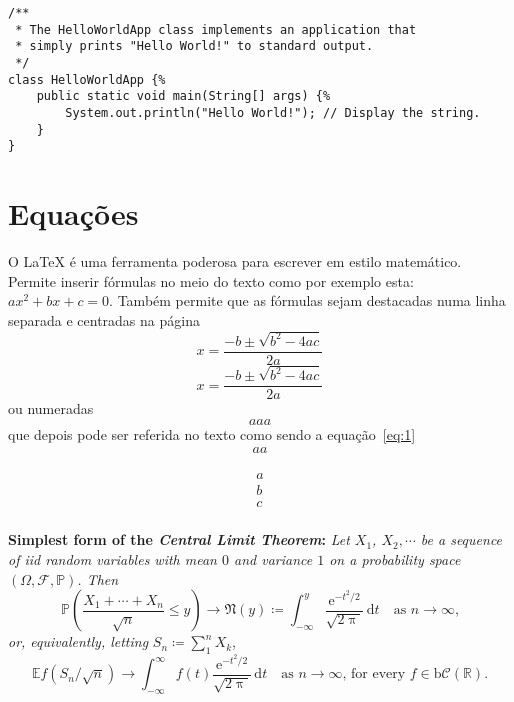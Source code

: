 \lstset{language=Java, caption=Hello World, label=lst:HelloWorld}
\begin{lstlisting}
/** 
 * The HelloWorldApp class implements an application that
 * simply prints "Hello World!" to standard output.
 */
class HelloWorldApp {%
    public static void main(String[] args) {%
        System.out.println("Hello World!"); // Display the string.
    }
}
\end{lstlisting}

\section{Equações}

O LaTeX é uma ferramenta poderosa para escrever em estilo matemático. Permite inserir fórmulas no meio do texto como por exemplo esta: $ax^2 + bx + c = 0$. Também permite que as fórmulas sejam destacadas numa linha separada e centradas na página 
$$x = \frac{-b \pm \sqrt{b^2-4ac}}{2a}$$
\[x = \frac{-b \pm \sqrt{b^2-4ac}}{2a}\]
ou numeradas 
\begin{equation}
aaa
\label{eq:1}
\end{equation}
que depois pode ser referida no texto como sendo a equação~\ref{eq:1}
$$\begin{array}{l}
aa
\end{array}
$$

\begin{eqnarray}
a\\
b\\
c\\
\end{eqnarray}

\textbf{Simplest form of the \textit{Central Limit Theorem}:} \textit{Let
$X_1$, $X_2,\cdots$ be a sequence of iid random variables with mean $0$ 
and variance $1$ on a probability space $(\Omega,\mathcal{F},\mathbb{P})$. Then}
\[\mathbb{P}\left(\frac{X_1+\cdots+X_n}{\sqrt{n}}\le y\right)\to\mathfrak{N}(y)\coloneq
\int_{-\infty}^y \frac{\mathrm{e}^{-t^2/2}}{\sqrt{2\uppi}}\,
\mathrm{d}t\quad\mbox{as $n\to\infty$,}\]
\textit{or, equivalently, letting} $S_n\coloneq\sum_1^n X_k$,
\[\mathbb{E} f\left(S_n/\sqrt{n}\right)\to \int_{-\infty}^\infty f(t)
\frac{\mathrm{e}^{-t^2/2}}{\sqrt{2\uppi}}\,\mathrm{d}t
\quad\mbox{as $n\to\infty$, for every $f\in\mathrm{b}
\mathcal{C}(\mathbb{R})$.}\]
